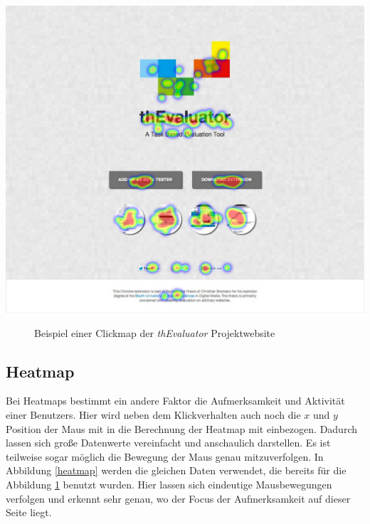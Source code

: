 \vspace{0.3cm}
\begin{center}
\includegraphics[scale=0.35]{./images/clickmap}
\end{center}
\begin{figure}[htb]
   \centering
   \caption{Beispiel einer Clickmap der \textit{thEvaluator} Projektwebsite}
    \label{clickmap}
\end{figure}


\subsection{Heatmap}

Bei Heatmaps bestimmt ein andere Faktor die Aufmerksamkeit und Aktivität einer Benutzers. Hier wird neben dem Klickverhalten auch noch die $ x $ und $ y $ Position der Maus mit in die Berechnung der Heatmap mit einbezogen. Dadurch lassen sich große Datenwerte vereinfacht und anschaulich darstellen. Es ist teilweise sogar möglich die Bewegung der Maus genau mitzuverfolgen. In Abbildung \ref{heatmap} werden die gleichen Daten verwendet, die bereits für die Abbildung \ref{clickmap} benutzt wurden. Hier lassen sich eindeutige Mausbewegungen verfolgen und erkennt sehr genau, wo der Focus der Aufmerksamkeit auf dieser Seite liegt.

